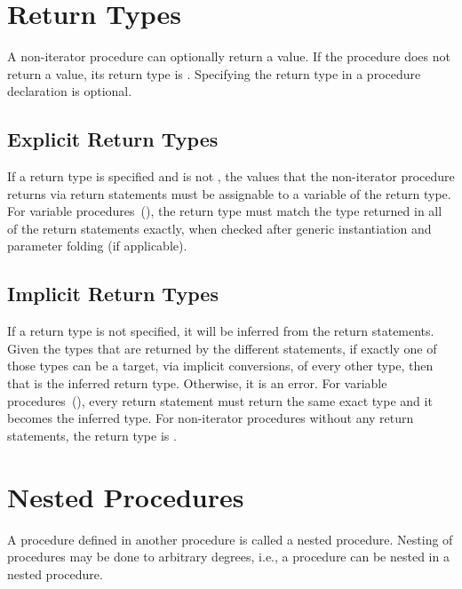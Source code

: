 \section{Return Types}
\label{Return_Types}

A non-iterator procedure can optionally return a value.  If the procedure does not
return a value, its return type is .  Specifying the return
type in a procedure declaration is optional.

\subsection{Explicit Return Types}
\label{Explicit_Return_Types}

If a return type is specified and is not , the values that the non-iterator procedure returns
via return statements must be assignable to a variable of the return
type.  For variable procedures~(), the return
type must match the type returned in all of the return statements
exactly, when checked after generic instantiation and parameter folding
(if applicable).

\subsection{Implicit Return Types}
\label{Implicit_Return_Types}

If a return type is not specified, it will be inferred from the return
statements.  Given the types that are returned by the different
statements, if exactly one of those types can be a target, via
implicit conversions, of every other type, then that is the inferred
return type.  Otherwise, it is an error.  For variable
procedures~(), every return statement must
return the same exact type and it becomes the inferred type.
For non-iterator procedures without any return statements, the return type is .


\section{Nested Procedures}
\label{Nested_Procedures}
\label{Procedure_Definition_Aspects__End}

A procedure defined in another procedure is called a nested procedure.
Nesting of procedures may be done to arbitrary degrees, i.e., a
procedure can be nested in a nested procedure.

